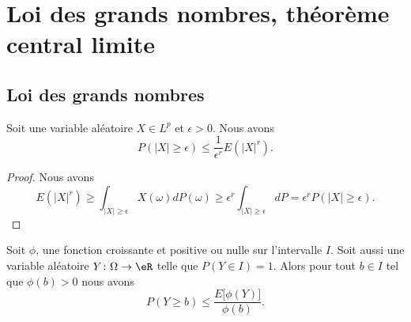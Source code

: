 \section{Loi des grands nombres, théorème central limite}

\subsection{Loi des grands nombres}

\begin{lemma}
    Soit une variable aléatoire \( X\in L^p\) et \( \epsilon>0\). Nous avons
    \begin{equation}
        P(| X |\geq \epsilon)\leq \frac{1}{ \epsilon^r }E(| X |^r).
    \end{equation}
\end{lemma}

\begin{proof}
    Nous avons
    \begin{equation}
        E(| X |^r)\geq\int_{| X |\geq \epsilon}X(\omega)dP(\omega)\geq \epsilon^r\int_{| X |\geq\epsilon}dP=\epsilon^rP(| X |\geq\epsilon).
    \end{equation}
\end{proof}

\begin{corollary}   \label{CorEWhIsBB}
    Soit \( \phi\), une fonction croissante et positive ou nulle sur l'intervalle \( I\). Soit aussi une variable aléatoire \( Y\colon \Omega\to \eR\) telle que \( P(Y\in I)=1\). Alors pour tout \( b\in I\) tel que \( \phi(b)>0\) nous avons
    \begin{equation}
        P(Y\geq b)\leq \frac{ E\big[ \phi(Y) \big] }{ \phi(b) }.
    \end{equation}
\end{corollary}

